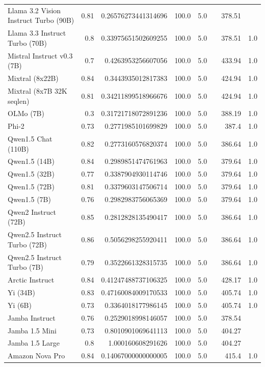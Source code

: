 \begin{table}[htp]
{\begin{tabular}{lrrrrrrr}
Llama 3.2 Vision Instruct Turbo (90B) & 0.81 & 0.26576273441314696 & 100.0 & 5.0 &  & 378.51 &  \\
Llama 3.3 Instruct Turbo (70B) & 0.8 & 0.33975651502609255 & 100.0 & 5.0 &  & 378.51 & 1.0 \\
Mistral Instruct v0.3 (7B) & 0.7 & 0.4263953256607056 & 100.0 & 5.0 &  & 433.94 & 1.0 \\
Mixtral (8x22B) & 0.84 & 0.3443935012817383 & 100.0 & 5.0 &  & 424.94 & 1.0 \\
Mixtral (8x7B 32K seqlen) & 0.81 & 0.34211899518966676 & 100.0 & 5.0 &  & 424.94 & 1.0 \\
OLMo (7B) & 0.3 & 0.31721718072891236 & 100.0 & 5.0 &  & 388.19 & 1.0 \\
Phi-2 & 0.73 & 0.2771985101699829 & 100.0 & 5.0 &  & 387.4 & 1.0 \\
Qwen1.5 Chat (110B) & 0.82 & 0.2773160576820374 & 100.0 & 5.0 &  & 386.64 & 1.0 \\
Qwen1.5 (14B) & 0.84 & 0.2989851474761963 & 100.0 & 5.0 &  & 379.64 & 1.0 \\
Qwen1.5 (32B) & 0.77 & 0.3387904930114746 & 100.0 & 5.0 &  & 379.64 & 1.0 \\
Qwen1.5 (72B) & 0.81 & 0.3379603147506714 & 100.0 & 5.0 &  & 379.64 & 1.0 \\
Qwen1.5 (7B) & 0.76 & 0.2982983756065369 & 100.0 & 5.0 &  & 379.64 & 1.0 \\
Qwen2 Instruct (72B) & 0.85 & 0.2812828135490417 & 100.0 & 5.0 &  & 386.64 & 1.0 \\
Qwen2.5 Instruct Turbo (72B) & 0.86 & 0.5056298255920411 & 100.0 & 5.0 &  & 386.64 & 1.0 \\
Qwen2.5 Instruct Turbo (7B) & 0.79 & 0.3522661328315735 & 100.0 & 5.0 &  & 386.64 & 1.0 \\
Arctic Instruct & 0.84 & 0.41247488737106325 & 100.0 & 5.0 &  & 428.17 & 1.0 \\
Yi (34B) & 0.83 & 0.47160084009170533 & 100.0 & 5.0 &  & 405.74 & 1.0 \\
Yi (6B) & 0.73 & 0.3364018177986145 & 100.0 & 5.0 &  & 405.74 & 1.0 \\
Jamba Instruct & 0.76 & 0.2529018998146057 & 100.0 & 5.0 &  & 378.54 &  \\
Jamba 1.5 Mini & 0.73 & 0.8010901069641113 & 100.0 & 5.0 &  & 404.27 &  \\
Jamba 1.5 Large & 0.8 & 1.000160608291626 & 100.0 & 5.0 &  & 404.27 &  \\
Amazon Nova Pro & 0.84 & 0.14067000000000005 & 100.0 & 5.0 &  & 415.4 & 1.0 \\

\end{tabular}}
\end{table}
